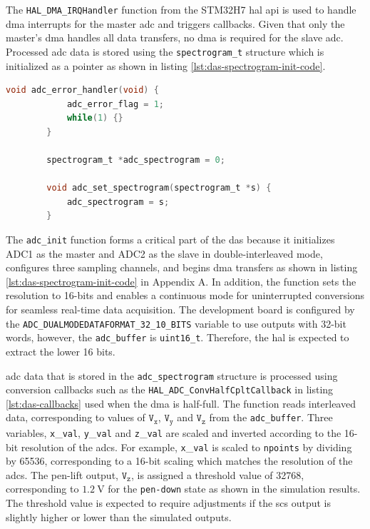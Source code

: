 \documentclass[class=report,11pt,crop=false]{standalone}
\begin{document}
	The \texttt{HAL\_DMA\_IRQHandler} function from the STM32H7 \acrshort{hal} \acrshort{api} is used to handle \acrshort{dma} interrupts for the master \acrshort{adc} and triggers callbacks. Given that only the master's \acrshort{dma} handles all data transfers, no \acrshort{dma} is required for the slave \acrshort{adc}. Processed \acrshort{adc} data is stored using the \texttt{spectrogram\_t} structure which is initialized as a pointer as shown in listing \ref{lst:das-spectrogram-init-code}. 
	
	\begin{lstlisting}[language=C, label={lst:das-spectrogram-init-code}, caption={The \texttt{HAL\_DMA\_IRQHandler} function is used to handle \acrshort{dma} transfers while the \texttt{adc\_set\_spectrogram(spectrogram\_t *s)} function is used to initialize a pointer to a \texttt{spectrogram} structure.}]
		void adc_error_handler(void) {
			adc_error_flag = 1;
			while(1) {}
		}
		
		spectrogram_t *adc_spectrogram = 0;
		
		void adc_set_spectrogram(spectrogram_t *s) {
			adc_spectrogram = s;
		}
	\end{lstlisting}
	
	The \texttt{adc\_init} function forms a critical part of the \acrshort{das} because it initializes ADC1 as the master and ADC2 as the slave in double-interleaved mode, configures three sampling channels, and begins \acrshort{dma} transfers as shown in listing \ref{lst:das-spectrogram-init-code} in Appendix A. In addition, the function sets the resolution to 16-bits and enables a continuous mode for uninterrupted conversions for seamless real-time data acquisition. The development board is configured by the \texttt{ADC\_DUALMODEDATAFORMAT\_32\_10\_BITS} variable to use outputs with 32-bit words, however, the \texttt{adc\_buffer} is \texttt{uint16\_t}. Therefore, the \acrshort{hal} is expected to extract the lower 16 bits. 
	
	\acrshort{adc} data that is stored in the \texttt{adc\_spectrogram} structure is processed using conversion callbacks such as the \texttt{HAL\_ADC\_ConvHalfCpltCallback} in listing \ref{lst:das-callbacks} used when the \acrshort{dma} is half-full. The function reads interleaved data, corresponding to values of $\texttt{V}_\texttt{x}$, $\texttt{V}_\texttt{y}$ and $\texttt{V}_\texttt{z}$ from the \texttt{adc\_buffer}. Three variables, \texttt{x}\_\texttt{val}, \texttt{y}\_\texttt{val} and \texttt{z}\_\texttt{val} are scaled and inverted according to the 16-bit resolution of the \acrshort{adc}s. For example, \texttt{x}\_\texttt{val} is scaled to \texttt{npoints} by dividing by 65536, corresponding to a 16-bit scaling which matches the resolution of the \acrshort{adc}s. The pen-lift output, $\texttt{V}_\texttt{z}$, is assigned a threshold value of 32768, corresponding to $\SI{1.2}{\volt}$ for the \texttt{pen-down} state as shown in the simulation results. The threshold value is expected to require adjustments if the \acrshort{scs} output is slightly higher or lower than the simulated outputs. 
	
\end{document}
